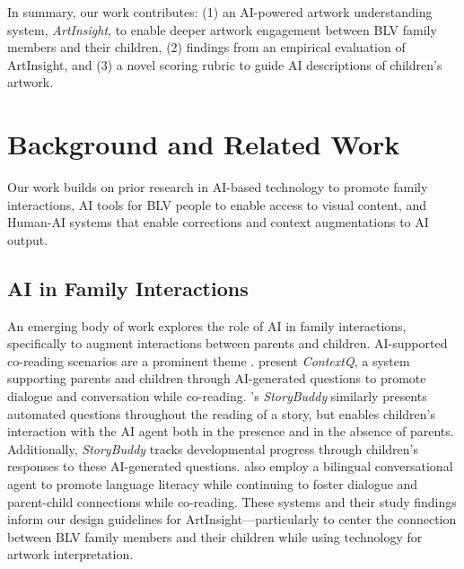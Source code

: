 \documentclass[sigconf]{acmart}
\begin{document}
In summary, our work contributes: (1) an AI-powered artwork understanding system, \textit{ArtInsight}, to enable deeper artwork engagement between BLV family members and their children, (2) findings from an empirical evaluation of ArtInsight, and (3) a novel scoring rubric to guide AI descriptions of children's artwork.

\section{Background and Related Work}
Our work builds on prior research in AI-based technology to promote family interactions, AI tools for BLV people to enable access to visual content, and Human-AI systems that enable corrections and context augmentations to AI output. 

\subsection{AI in Family Interactions}
An emerging body of work explores the role of AI in family interactions, specifically to augment interactions between parents and children. AI-supported co-reading scenarios are a prominent theme \cite{Zhang_StoryBuddy, Dietz_ContextQ, Lin_FishScales, Xu_Bilingual}. \citet{Dietz_ContextQ} present \textit{ContextQ}, a system supporting parents and children through AI-generated questions to promote dialogue and conversation while co-reading. \citet{Zhang_StoryBuddy}'s \textit{StoryBuddy} similarly presents automated questions throughout the reading of a story, but enables children's interaction with the AI agent both in the presence and in the absence of parents. Additionally, \textit{StoryBuddy} tracks developmental progress through children's responses to these AI-generated questions. \citet{Xu_Bilingual} also employ a bilingual conversational agent to promote language literacy while continuing to foster dialogue and parent-child connections while co-reading. These systems and their study findings inform our design guidelines for ArtInsight---particularly to center the connection between BLV family members and their children while using technology for artwork interpretation.
\end{document}
